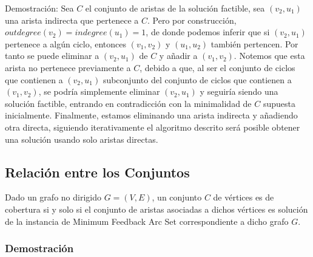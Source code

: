 \documentclass{article}
\begin{document}
\begin{enumerate}
    Demostración: Sea $C$ el conjunto de aristas de la solución factible, sea $(v_2, u_1)$ una arista indirecta que pertenece a $C$. Pero por construcción, $outdegree(v_2) = indegree(u_1) = 1$, de donde podemos inferir que si $(v_2, u_1)$ pertenece a algún ciclo, entonces $(v_1, v_2)$ y $(u_1, u_2)$ también pertencen. Por tanto se puede eliminar a $(v_2, u_1)$ de $C$ y añadir a $(v_1, v_2)$. Notemos que esta arista no pertenece previamente a $C$, debido a que, al ser el conjunto de ciclos que contienen a $(v_2, u_1)$ subconjunto del conjunto de ciclos que contienen a $(v_1, v_2)$, se podría simplemente eliminar $(v_2, u_1)$ y seguiría siendo una solución factible, entrando en contradicción con la minimalidad de $C$ supuesta inicialmente. Finalmente, estamos eliminando una arista indirecta y añadiendo otra directa, siguiendo iterativamente el algoritmo descrito será posible obtener una solución usando solo aristas directas.
\end{enumerate}

\subsection{Relación entre los Conjuntos}

Dado un grafo no dirigido $ G = (V, E) $, un conjunto $ C $ de vértices es de cobertura si y solo si el conjunto de aristas asociadas a dichos vértices es solución de la instancia de Minimum Feedback Arc Set correspondiente a dicho grafo $ G $.

\subsubsection{Demostración}
\end{document}
